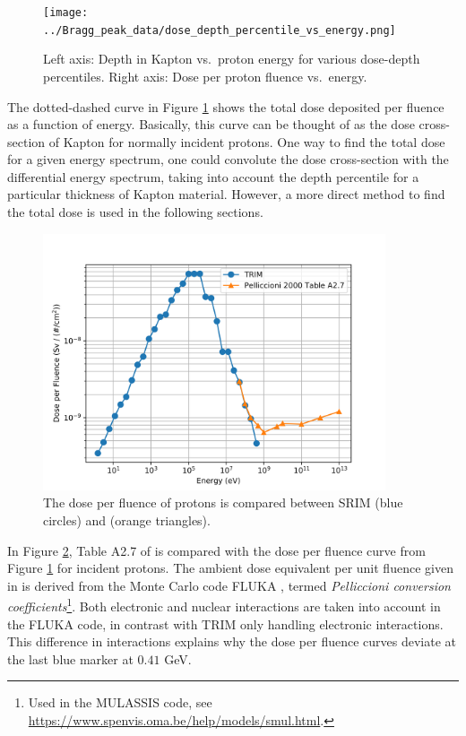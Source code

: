 \documentclass{hitec}
\begin{document}
\begin{figure}[htbp!]
	\centering
	\texttt{[image: ../Bragg\_peak\_data/dose\_depth\_percentile\_vs\_energy.png]}
	\caption{Left axis: Depth in Kapton vs.\ proton energy for various dose-depth percentiles. Right axis: Dose per proton fluence vs.\ energy.}\label{fig:dose_depth_percentile_vs_energy}
\end{figure}


The dotted-dashed curve in Figure \ref{fig:dose_depth_percentile_vs_energy} shows the total dose deposited per fluence as a function of energy. Basically, this curve can be thought of as the dose cross-section of Kapton for normally incident protons. One way to find the total dose for a given energy spectrum, one could convolute the dose cross-section with the differential energy spectrum, taking into account the depth percentile for a particular thickness of Kapton material. However, a more direct method to find the total dose is used in the following sections.

\begin{figure}[h!]
	\centering
	\includegraphics[width=0.9\textwidth]{../Bragg_peak_data/comparison_dose_vs_energy.png}
	\caption{The dose per fluence of protons is compared between SRIM (blue circles) and \cite{pelliccioni2000overview} (orange triangles).}\label{fig:comparison_dose_vs_energy}
\end{figure}

In Figure \ref{fig:comparison_dose_vs_energy}, Table A2.7 of \cite{pelliccioni2000overview} is compared with the dose per fluence curve from Figure \ref{fig:dose_depth_percentile_vs_energy} for incident protons. The ambient dose equivalent per unit fluence given in \cite{pelliccioni2000overview} is derived from the Monte Carlo code FLUKA \citep{battistoni2015overview}, termed \textit{Pelliccioni conversion coefficients}\footnote{Used in the MULASSIS code, see \url{https://www.spenvis.oma.be/help/models/smul.html}.}. Both electronic and nuclear interactions are taken into account in the FLUKA code, in contrast with TRIM only handling electronic interactions. This difference in interactions explains why the dose per fluence curves deviate at the last blue marker at $0.41$ GeV.
\end{document}
